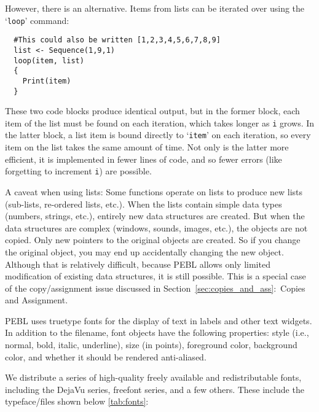 However, there is an alternative.  Items from
lists can be iterated over using the `\texttt{loop}' command:  
\begin{verbatim}
  #This could also be written [1,2,3,4,5,6,7,8,9]
  list <- Sequence(1,9,1)
  loop(item, list) 
  {
    Print(item)
  }
\end{verbatim}
These two code blocks produce identical output, but in the former block, each item of the list must be found on each iteration, which takes longer as \texttt{i} grows. In the latter block, a list item is bound directly to `\texttt{item}' on each iteration, so every item on the list takes the same amount of time. Not only is the latter more efficient, it is implemented in fewer lines of code, and so fewer errors (like forgetting to increment \texttt{i}) are possible.

A caveat when using lists: Some functions operate on lists to produce
new lists (sub-lists, re-ordered lists, etc.). When the lists contain
simple data types (numbers, strings, etc.), entirely new data
structures are created. But when the data structures are complex
(windows, sounds, images, etc.), the objects are not copied. Only new
pointers to the original objects are created. So if you change the
original object, you may end up accidentally changing the new
object. Although that is relatively difficult, because PEBL allows
only limited modification of existing data structures, it is still
possible. This is a special case of the copy/assignment issue
discussed in Section~\ref{sec:copies_and_ass}:~Copies and Assignment.



\newpage
{}

PEBL uses truetype fonts for the display of text in labels and other text
widgets.  In addition to the filename, font objects have the following properties: style (i.e., normal, bold, italic, underline), size (in points),
foreground color, background color, and whether it should be rendered
anti-aliased.

We distribute a series of high-quality freely available
and redistributable fonts, including the DejaVu series,
freefont series, and a few others.  These include
the typeface/files shown below \ref{tab:fonts}:

